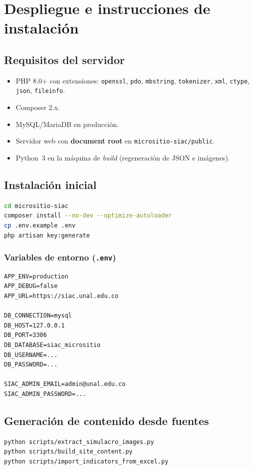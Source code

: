 \chapter{Despliegue e instrucciones de instalación}

\section{Requisitos del servidor}
\begin{itemize}
  \item PHP 8.0+ con extensiones: \texttt{openssl}, \texttt{pdo}, \texttt{mbstring}, \texttt{tokenizer}, \texttt{xml}, \texttt{ctype}, \texttt{json}, \texttt{fileinfo}.
  \item Composer 2.x.
  \item MySQL/MariaDB en producción.
  \item Servidor web con \textbf{document root} en \texttt{micrositio-siac/public}.
  \item Python~3 en la máquina de \emph{build} (regeneración de JSON e imágenes).
\end{itemize}

\section{Instalación inicial}
\begin{lstlisting}[language=bash]
cd micrositio-siac
composer install --no-dev --optimize-autoloader
cp .env.example .env
php artisan key:generate
\end{lstlisting}

\subsection{Variables de entorno (\texttt{.env})}
\begin{lstlisting}
APP_ENV=production
APP_DEBUG=false
APP_URL=https://siac.unal.edu.co

DB_CONNECTION=mysql
DB_HOST=127.0.0.1
DB_PORT=3306
DB_DATABASE=siac_micrositio
DB_USERNAME=...
DB_PASSWORD=...

SIAC_ADMIN_EMAIL=admin@unal.edu.co
SIAC_ADMIN_PASSWORD=...
\end{lstlisting}

\section{Generación de contenido desde fuentes}
\begin{lstlisting}[language=bash]
python scripts/extract_simulacro_images.py
python scripts/build_site_content.py
python scripts/import_indicators_from_excel.py
\end{lstlisting}

